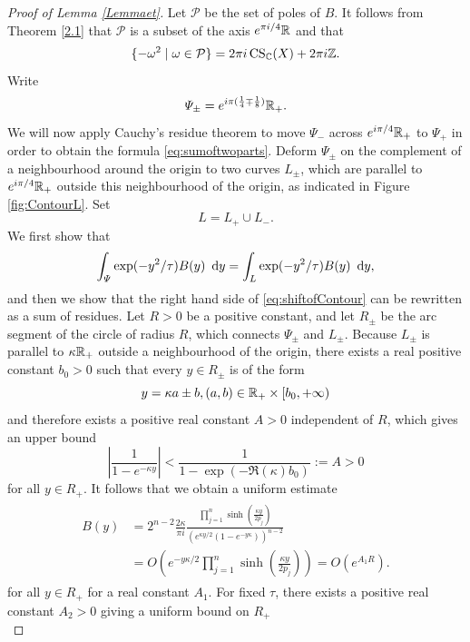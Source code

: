 \begin{proof}[Proof of Lemma \ref{Lemmaet}]
Let $\mathcal{P}$ be the set of poles of $B$. It follows from Theorem \ref{2.1} that $\mathcal{P}$ is a subset of the axis $e^{\pi i/4}\mathbb{R}$ and that 
\begin{equation}
 \{ -\omega^2  \mid  \omega \in \mathcal{P}  \}  = 2\pi i\operatorname{CS}_{\mathbb{C}}(X) + 2\pi i\mathbb{Z}.
\end{equation}  
Write $$\varPsi_\pm= e^{i \pi (\frac14 \mp \frac18)}\mathbb{R}_+.$$ We will now  apply Cauchy's residue theorem to move $\varPsi_-$ across $e^{i \pi /4}\mathbb{R}_+$ to $\varPsi_+$  in order to obtain the formula \eqref{eq:sumoftwoparts}. Deform $\varPsi_\pm$ on the complement of a neighbourhood around the origin to two curves $L_\pm$, which are parallel to $e^{i \pi /4}\mathbb{R}_+$ outside this neighbourhood of the origin, as indicated in Figure \ref{fig:ContourL}. Set $$L=L_+ \cup L_-.$$ We first show that 
\begin{equation}  
\label{eq:shiftofContour} \int_{\varPsi} \exp(-y^2/\tau) B(y) \ \operatorname{{d}\hskip-.6mm} y= \int_{L} \exp(-y^2/\tau) B(y) \ \operatorname{{d}\hskip-.6mm} y,   \end{equation}
and then we show that the right hand side of \eqref{eq:shiftofContour} can be rewritten as a sum of residues. Let $R>0$ be a positive constant, and let $R_\pm$ be the arc segment of the circle of radius $R$, which connects $\varPsi_\pm$ and $L_\pm$.  Because $L_\pm$ is parallel to $\kappa \mathbb{R}_+$ outside a neighbourhood of the origin, there exists a real positive constant $b_0 >0$ such that every $y \in R_\pm$ is of the form
$$y= \kappa a \pm b, (a,b) \in \mathbb{R}_+ \times [b_0,+\infty)$$
and therefore exists a positive real constant $A>0$ independent of $R$, which gives an upper bound
\begin{equation}
\left\lvert \frac{1}{1-e^{-\kappa y}}\right\rvert <\frac{1}{1-\exp\left(-\Re(\kappa) b_0\right)}:=A>0
\end{equation}
for all $y \in R_+$.
It follows that we obtain a uniform estimate 
\begin{align} \label{eq:Estimation1} \begin{split} B(y) &= 2^{n-2}\frac{2\kappa}{\pi i}\frac{\prod_{j=1}^n \sinh(\frac{\kappa y}{2p_j})}{\left( e^{\kappa y/2}(1-e^{-y\kappa }) \right)^{n-2}}
\\&=  O \left( e^{-y\kappa /2}\prod_{j=1}^n \sinh\left(\frac{\kappa y}{2p_j}\right) \right)= O(e^{A_1R}). \end{split}  \end{align}
for all $y \in R_+$ for a real constant $A_1$.
For fixed  $\tau$, there exists a positive real constant $A_2>0$ giving a uniform bound on $R_+$
\begin{equation}  \label{eq:Estimation2}

\end{equation}
\end{proof}
